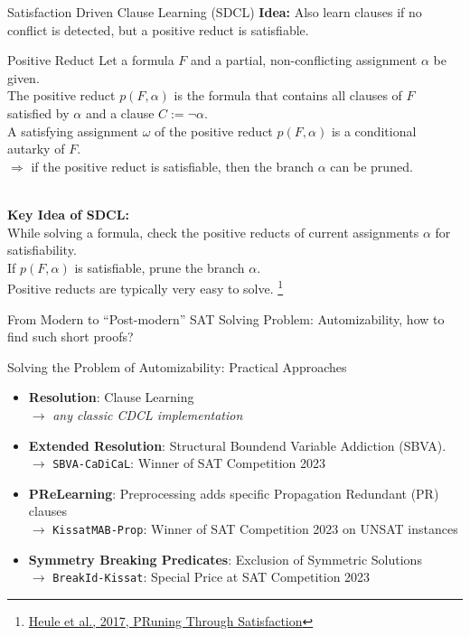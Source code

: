 \documentclass[t]{sdqbeamer}
\begin{document}
\begin{frame}{Satisfaction Driven Clause Learning (SDCL)}
\textbf{Idea:} Also learn clauses if no conflict is detected, but a positive reduct is satisfiable.\\[1ex]

\begin{block}{Positive Reduct}
Let a formula $F$ and a partial, non-conflicting assignment $\alpha$ be given.\\[1ex]
The positive reduct $p(F, \alpha)$ is the formula that contains all clauses of $F$ satisfied by $\alpha$ and a clause $C := \lnot \alpha$.\\[1ex]
A satisfying assignment $\omega$ of the positive reduct $p(F,\alpha)$ is a conditional autarky of $F$.\\[1ex]
$\Rightarrow$ if the positive reduct is satisfiable, then the branch $\alpha$ can be pruned.
\end{block}~\\
\textbf{Key Idea of SDCL:}\\[1ex]
While solving a formula, check the positive reducts of current assignments $\alpha$ for satisfiability.\\[1ex]
If $p(F, \alpha)$ is satisfiable, prune the branch $\alpha$.\\[1ex]
Positive reducts are typically very easy to solve.%
\footnote{\href{https://doi.org/10.1007/978-3-319-70389-3_12}{Heule et al., 2017, PRuning Through Satisfaction}}
\end{frame}


\begin{frame}{From Modern to ``Post-modern'' SAT Solving}
Problem: Automizability, how to find such short proofs?~\\[1ex]
\begin{block}{Solving the Problem of Automizability: Practical Approaches}
\begin{itemize}\setlength{\itemsep}{1em}
\item \textbf{Resolution}: Clause Learning\\[1ex]
$\bm\rightarrow$ \emph{any classic CDCL implementation}
\item \textbf{Extended Resolution}: Structural Boundend Variable Addiction (SBVA).\\[1ex]
$\bm\rightarrow$ \texttt{SBVA-CaDiCaL}: Winner of SAT Competition 2023
\item \textbf{PReLearning}: Preprocessing adds specific Propagation Redundant (PR) clauses\\[1ex]
$\bm\rightarrow$ \texttt{KissatMAB-Prop}: Winner of SAT Competition 2023 on UNSAT instances
\item \textbf{Symmetry Breaking Predicates}: Exclusion of Symmetric Solutions\\[1ex]
$\bm\rightarrow$ \texttt{BreakId-Kissat}: Special Price at SAT Competition 2023
\end{itemize}
\end{block}
\end{frame}
\end{document}
